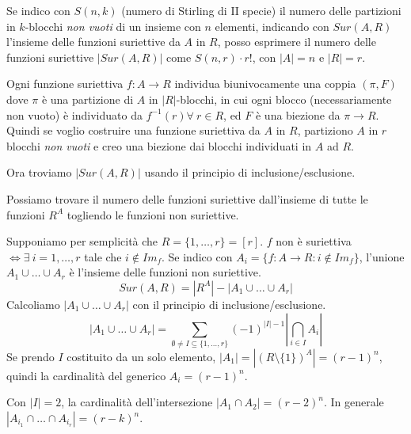 


Se indico con $S(n, k)$ (numero di Stirling di II specie) il numero delle partizioni in $k$-blocchi \textit{non vuoti} di un insieme con $n$ elementi, indicando con $Sur(A, R)$ l'insieme delle funzioni suriettive da $A$ in $R$, posso esprimere il numero delle funzioni suriettive $|Sur(A,R)| $ come $S(n,r) \cdot r!$, con $|A| = n$ e $|R| = r$.

Ogni funzione suriettiva $f : A \to R $ individua biunivocamente una coppia $(\pi, F)$ dove $\pi$ \`e una partizione di $A$ in $|R|$-blocchi, in cui ogni blocco (necessariamente non vuoto) \`e individuato da $f^{-1}(r) \forall \ r \in R$, ed $F$ \`e una biezione da $\pi \to R$. Quindi se voglio costruire una funzione suriettiva da $A$ in $R$, partiziono $A$ in $r$ blocchi \textit{non vuoti} e creo una biezione dai blocchi individuati in $A$ ad $R$.

Ora troviamo $|Sur(A,R)|$ usando il principio di inclusione/esclusione.

Possiamo trovare il numero delle funzioni suriettive dall'insieme di tutte le funzioni $R^A$ togliendo le funzioni non suriettive.

Supponiamo per semplicit\`a che $R = \{ 1, \ldots , r\} = [r]$. $f$ non \`e suriettiva $\Leftrightarrow \exists \ i = 1, \ldots, r$ tale che $i \notin Im_f$. Se indico con $A_i = \{ f : A \to R : i \notin Im_f \}$, l'unione $A_1 \cup \ldots \cup A_r$ \`e l'insieme delle funzioni non suriettive.
\[
Sur(A,R) = |R^A| - |A_1 \cup \dots \cup A_r|
\]
Calcoliamo $|A_1 \cup \ldots \cup A_r|$ con il principio di inclusione/esclusione.
\[
| A_1 \cup \ldots \cup A_r |  = 
\sum_{\emptyset \neq I \subseteq \{ 1, \ldots, r \}} (-1)^{|I| - 1} \left| \bigcap_{i \in I} A_i \right|
\]
Se prendo $I$ costituito da un solo elemento, $|A_1| = \left| (R \setminus \{ 1 \})^A \right| = (r - 1)^n$, quindi la cardinalit\`a del generico $A_i = (r-1)^n$.

Con $|I| = 2$, la cardinalit\`a dell'intersezione $|A_1 \cap A_2| = (r - 2)^n$. In generale $|A_{i_1} \cap \dots \cap A_{i_r}| = (r - k)^n$.


